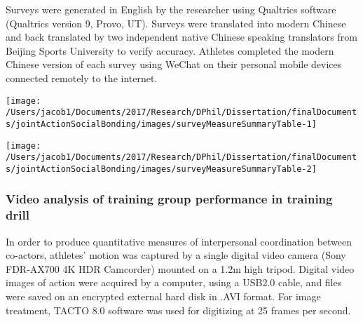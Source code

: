 \documentclass[english]{article}\usepackage[]{graphicx}\usepackage[]{color}
\makeatletter
\def\maxwidth{ %
  \ifdim\Gin@nat@width>\linewidth
    \linewidth
  \else
    \Gin@nat@width
  \fi
}
\newenvironment{knitrout}{}{} %
\makeatother
\begin{document}
Surveys were generated in English by the researcher using Qualtrics software (Qualtrics version 9, Provo, UT). Surveys were translated into modern Chinese and back translated by two independent native Chinese speaking translators from Beijing Sports University to verify accuracy.  Athletes completed the modern Chinese version of each survey using WeChat on their personal mobile devices connected remotely to the internet.


\begin{knitrout}
\color{fgcolor}

{\centering \texttt{[image: /Users/jacob1/Documents/2017/Research/DPhil/Dissertation/finalDocuments/jointActionSocialBonding/images/surveyMeasureSummaryTable-1]} 

}




{\centering \texttt{[image: /Users/jacob1/Documents/2017/Research/DPhil/Dissertation/finalDocuments/jointActionSocialBonding/images/surveyMeasureSummaryTable-2]} 

}



\end{knitrout}


\subsubsection{Video analysis of training group performance in training drill}
In order to produce quantitative measures of interpersonal coordination between co-actors, athletes’ motion was captured by a single digital video camera (Sony FDR-AX700 4K HDR Camcorder) mounted on a 1.2m high tripod. Digital video images of action were acquired by a computer, using a USB2.0 cable, and files were saved on an encrypted external hard disk in .AVI format. For image treatment, TACTO 8.0 software was used for digitizing at 25 frames per second.
\end{document}

